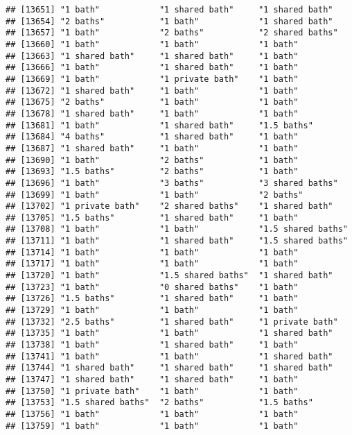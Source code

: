 \documentclass[
]{article}
\begin{document}
\begin{verbatim}
## [13651] "1 bath"            "1 shared bath"     "1 shared bath"    
## [13654] "2 baths"           "1 bath"            "1 shared bath"    
## [13657] "1 bath"            "2 baths"           "2 shared baths"   
## [13660] "1 bath"            "1 bath"            "1 bath"           
## [13663] "1 shared bath"     "1 shared bath"     "1 bath"           
## [13666] "1 bath"            "1 shared bath"     "1 bath"           
## [13669] "1 bath"            "1 private bath"    "1 bath"           
## [13672] "1 shared bath"     "1 bath"            "1 bath"           
## [13675] "2 baths"           "1 bath"            "1 bath"           
## [13678] "1 shared bath"     "1 bath"            "1 bath"           
## [13681] "1 bath"            "1 shared bath"     "1.5 baths"        
## [13684] "4 baths"           "1 shared bath"     "1 bath"           
## [13687] "1 shared bath"     "1 bath"            "1 bath"           
## [13690] "1 bath"            "2 baths"           "1 bath"           
## [13693] "1.5 baths"         "2 baths"           "1 bath"           
## [13696] "1 bath"            "3 baths"           "3 shared baths"   
## [13699] "1 bath"            "1 bath"            "2 baths"          
## [13702] "1 private bath"    "2 shared baths"    "1 shared bath"    
## [13705] "1.5 baths"         "1 shared bath"     "1 bath"           
## [13708] "1 bath"            "1 bath"            "1.5 shared baths" 
## [13711] "1 bath"            "1 shared bath"     "1.5 shared baths" 
## [13714] "1 bath"            "1 bath"            "1 bath"           
## [13717] "1 bath"            "1 bath"            "1 bath"           
## [13720] "1 bath"            "1.5 shared baths"  "1 shared bath"    
## [13723] "1 bath"            "0 shared baths"    "1 bath"           
## [13726] "1.5 baths"         "1 shared bath"     "1 bath"           
## [13729] "1 bath"            "1 bath"            "1 bath"           
## [13732] "2.5 baths"         "1 shared bath"     "1 private bath"   
## [13735] "1 bath"            "1 bath"            "1 shared bath"    
## [13738] "1 bath"            "1 shared bath"     "1 bath"           
## [13741] "1 bath"            "1 bath"            "1 shared bath"    
## [13744] "1 shared bath"     "1 shared bath"     "1 shared bath"    
## [13747] "1 shared bath"     "1 shared bath"     "1 bath"           
## [13750] "1 private bath"    "1 bath"            "1 bath"           
## [13753] "1.5 shared baths"  "2 baths"           "1.5 baths"        
## [13756] "1 bath"            "1 bath"            "1 bath"           
## [13759] "1 bath"            "1 bath"            "1 bath"           

\end{verbatim}
\end{document}
